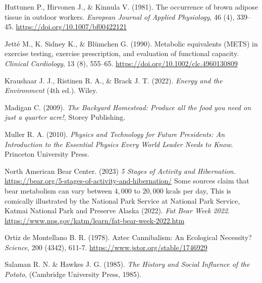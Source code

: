 \documentclass[11pt,letter]{article}
\begin{document}
\begin{thebibliography}{99}
Huttunen P., Hirvonen J., \& Kinnula V.
(1981).
The occurrence of brown adipose tissue in outdoor workers.
\textit{European Journal of Applied Physiology}, 
46 (4), 339--45. 
\url{https://doi.org/10.1007/bf00422121}

Jetté M., K. Sidney K., \& Blümchen G.
(1990). 
Metabolic equivalents (METS) in exercise testing, exercise prescription, and evaluation of functional capacity.
\textit{Clinical Cardiology}, 
13 (8), 555--65.
\url{https://doi.org/10.1002/clc.4960130809}

Kraushaar J. J., Ristinen R. A., \& Brack J. T.
(2022).
\textit{Energy and the Environment} (4th ed.).
Wiley.

Madigan C. 
(2009).
\textit{The Backyard Homestead: Produce all the food you need on just a quarter acre!},
Storey Publishing.



Muller R. A. 
(2010).
\textit{Physics and Technology for Future Presidents: An Introduction to the Essential Physics Every World Leader Needs to Know}.
Princeton University Press.

North American Bear Center.
(2023)
\textit{5 Stages of Activity and Hibernation.}
\url{https://bear.org/5-stages-of-activity-and-hibernation/}
%
Some sources claim that bear metabolism can vary between $4,000$ to $20,000$ kcals per day, 
This is comically illustrated by the National Park Service at 
National Park Service, Katmai National Park and Preserve Alaska 
(2022).
\textit{Fat Bear Week 2022}.
\url{https://www.nps.gov/katm/learn/fat-bear-week-2022.htm}

Ortiz de Montellano B. R.
(1978).
Aztec Cannibalism: An Ecological Necessity?
\textit{Science}, 200 (4342), 611-7.
\url{https://www.jstor.org/stable/1746929}

Salaman R. N. \& Hawkes J. G.
(1985).
\textit{The History and Social Influence of the Potato},
(Cambridge University Press, 1985).


\end{thebibliography}
\end{document}
